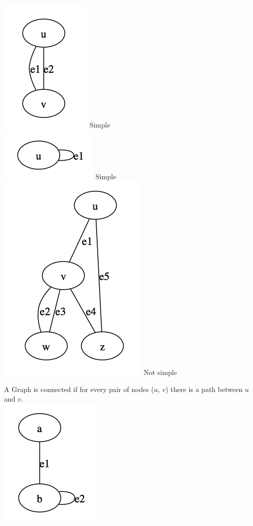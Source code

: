 \begin{example*}
\includegraphics[scale=0.4]{diagrams/Chapter1_Example3}
Simple\\
\includegraphics[scale=0.4]{diagrams/Chapter1_Example4}
Simple\\
\includegraphics[scale=0.45]{diagrams/Chapter1_Example5}
Not simple\\
\end{example*}

A Graph is connected if for every pair of nodes ($u$, $v$) there is a path between $u$ and $v$.\\

\includegraphics[scale=0.45]{diagrams/Chapter1_Example6}

